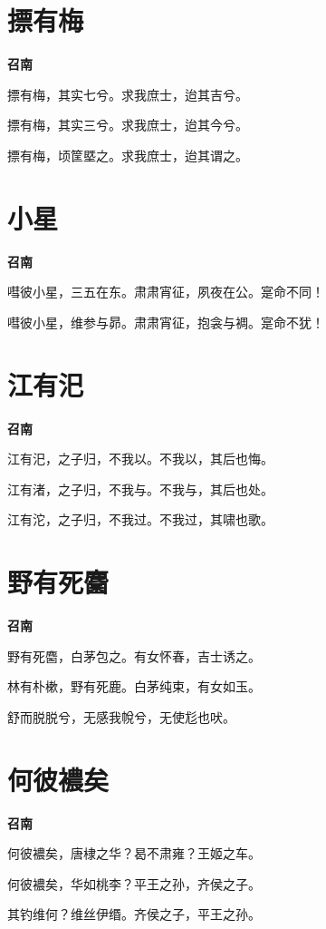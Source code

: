 \documentclass[12pt,a4paper]{ctexbook}
\begin{document}
\section{摽有梅}
\textbf{召南}\par\vspace{0.5em}
摽有梅，其实七兮。求我庶士，迨其吉兮。\par
摽有梅，其实三兮。求我庶士，迨其今兮。\par
摽有梅，顷筐塈之。求我庶士，迨其谓之。\par

\section{小星}
\textbf{召南}\par\vspace{0.5em}
嘒彼小星，三五在东。肃肃宵征，夙夜在公。寔命不同！\par
嘒彼小星，维参与昴。肃肃宵征，抱衾与裯。寔命不犹！\par

\section{江有汜}
\textbf{召南}\par\vspace{0.5em}
江有汜，之子归，不我以。不我以，其后也悔。\par
江有渚，之子归，不我与。不我与，其后也处。\par
江有沱，之子归，不我过。不我过，其啸也歌。\par

\section{野有死麕}
\textbf{召南}\par\vspace{0.5em}
野有死麕，白茅包之。有女怀春，吉士诱之。\par
林有朴樕，野有死鹿。白茅纯束，有女如玉。\par
舒而脱脱兮，无感我帨兮，无使尨也吠。\par

\section{何彼襛矣}
\textbf{召南}\par\vspace{0.5em}
何彼襛矣，唐棣之华？曷不肃雍？王姬之车。\par
何彼襛矣，华如桃李？平王之孙，齐侯之子。\par
其钓维何？维丝伊缗。齐侯之子，平王之孙。\par
\end{document}
